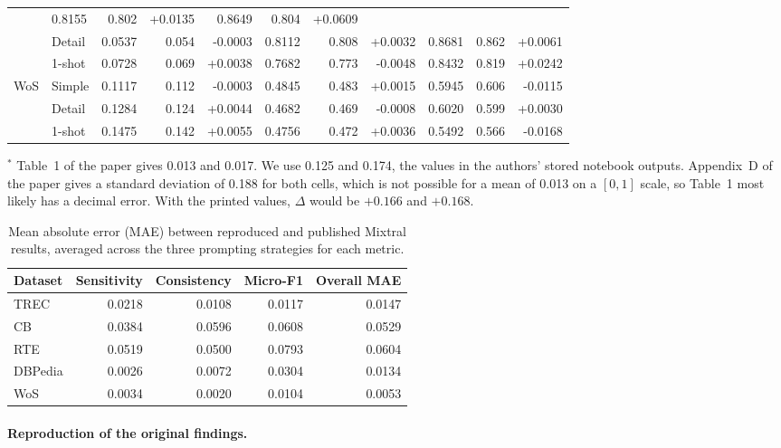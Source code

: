 \begin{table}[H]
{\begin{tabular}{llrrrrrrrrr}
& 0.8155 & 0.802 & +0.0135
& 0.8649 & 0.804 & +0.0609 \\
& Detail
& 0.0537 & 0.054 & -0.0003
& 0.8112 & 0.808 & +0.0032
& 0.8681 & 0.862 & +0.0061 \\
& 1-shot
& 0.0728 & 0.069 & +0.0038
& 0.7682 & 0.773 & -0.0048
& 0.8432 & 0.819 & +0.0242 \\
\midrule
WoS & Simple
& 0.1117 & 0.112 & -0.0003
& 0.4845 & 0.483 & +0.0015
& 0.5945 & 0.606 & -0.0115 \\
& Detail
& 0.1284 & 0.124 & +0.0044
& 0.4682 & 0.469 & -0.0008
& 0.6020 & 0.599 & +0.0030 \\
& 1-shot
& 0.1475 & 0.142 & +0.0055
& 0.4756 & 0.472 & +0.0036
& 0.5492 & 0.566 & -0.0168 \\
\bottomrule
\end{tabular}%
}

\vspace{2pt}
\raggedright\footnotesize
$^{\ast}$ Table~1 of the paper gives 0.013 and 0.017. We use 0.125 and 0.174,
the values in the authors' stored notebook outputs. Appendix~D of the paper
gives a standard deviation of 0.188 for both cells, which is not possible for a
mean of 0.013 on a $[0,1]$ scale, so Table~1 most likely has a decimal error.
With the printed values, $\Delta$ would be $+0.166$ and $+0.168$.
\end{table}

\begin{table}[H]
\centering
\caption{Mean absolute error (MAE) between reproduced
and published Mixtral results, averaged across
the three prompting strategies for each metric.}
\label{tab:mixtral-mae}
\small
\begin{tabular}{lrrrr}
\toprule
Dataset & Sensitivity & Consistency & Micro-F1 & Overall MAE \\
\midrule
TREC    & 0.0218 & 0.0108 & 0.0117 & 0.0147 \\
CB      & 0.0384 & 0.0596 & 0.0608 & 0.0529 \\
RTE     & 0.0519 & 0.0500 & 0.0793 & 0.0604 \\
DBPedia & 0.0026 & 0.0072 & 0.0304 & 0.0134 \\
WoS     & 0.0034 & 0.0020 & 0.0104 & 0.0053 \\
\bottomrule
\end{tabular}
\end{table}

\paragraph{Reproduction of the original findings.}
\mbox{}\par

